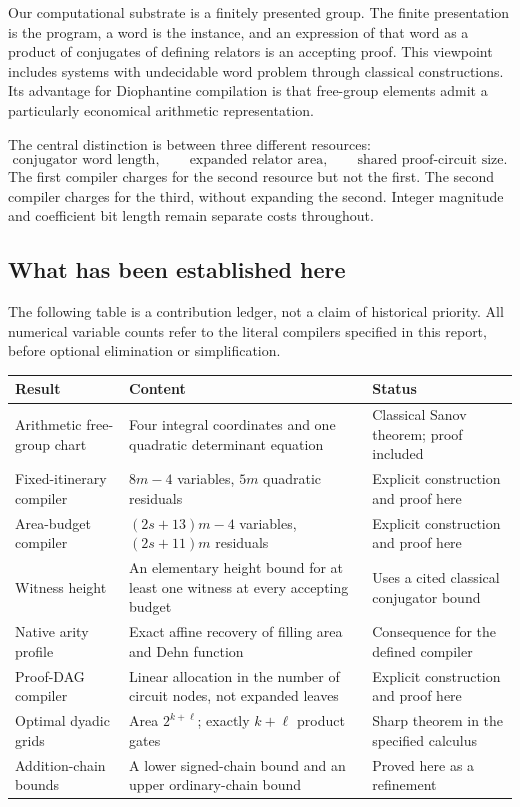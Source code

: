 \documentclass[11pt,letterpaper]{article}
\theoremstyle{definition}
\theoremstyle{remark}
\begin{document}
Our computational substrate is a finitely presented group. The finite presentation is the program, a word is the instance, and an expression of that word as a product of conjugates of defining relators is an accepting proof. This viewpoint includes systems with undecidable word problem through classical constructions. Its advantage for Diophantine compilation is that free-group elements admit a particularly economical arithmetic representation.

The central distinction is between three different resources:
\begin{equation}\label{gts:vk:eq:three-resources}
 \text{conjugator word length},\qquad
 \text{expanded relator area},\qquad
 \text{shared proof-circuit size}.
\end{equation}
The first compiler charges for the second resource but not the first. The second compiler charges for the third, without expanding the second. Integer magnitude and coefficient bit length remain separate costs throughout.

\subsection{What has been established here}

The following table is a contribution ledger, not a claim of historical priority. All numerical variable counts refer to the literal compilers specified in this report, before optional elimination or simplification.

\begin{center}
\begin{tabular}{L{0.24\textwidth}L{0.42\textwidth}L{0.23\textwidth}}
\toprule
Result & Content & Status\\
\midrule
Arithmetic free-group chart & Four integral coordinates and one quadratic determinant equation & Classical Sanov theorem; proof included\\
Fixed-itinerary compiler & $8m-4$ variables, $5m$ quadratic residuals & Explicit construction and proof here\\
Area-budget compiler & $(2s+13)m-4$ variables, $(2s+11)m$ residuals & Explicit construction and proof here\\
Witness height & An elementary height bound for at least one witness at every accepting budget & Uses a cited classical conjugator bound\\
Native arity profile & Exact affine recovery of filling area and Dehn function & Consequence for the defined compiler\\
Proof-DAG compiler & Linear allocation in the number of circuit nodes, not expanded leaves & Explicit construction and proof here\\
Optimal dyadic grids & Area $2^{k+\ell}$; exactly $k+\ell$ product gates & Sharp theorem in the specified calculus\\
Addition-chain bounds & A lower signed-chain bound and an upper ordinary-chain bound & Proved here as a refinement\\
\bottomrule
\end{tabular}
\end{center}
\end{document}
